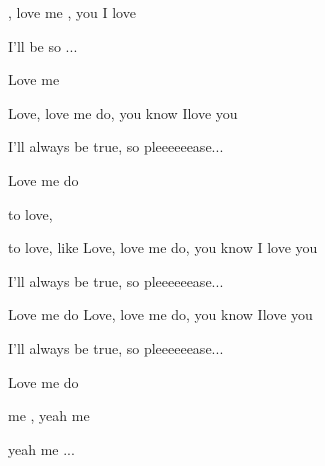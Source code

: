 
\zs

, love me ,
you  I love 

I'll  be 
so ...

Love me 
\ks

\zs
Love, love me do,
you know Ilove you

I'll always be true,
so pleeeeeease...

Love me do
\ks
\zr

 to love,  

 to love,  like 
\kr
\zs
Love, love me do,
you know I love you

I'll always be true,
so pleeeeeease...

Love me do
\ks
\zs
Love, love me do,
you know Ilove you

I'll always be true,
so pleeeeeease...

Love me do
\ks


 me , yeah  me 

yeah  me ...

\kp





